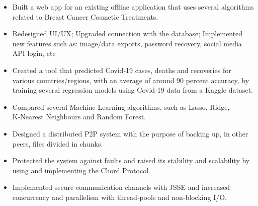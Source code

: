 \documentclass[8pt,a4paper]{altacv}
\begin{document}
\vspace{2mm}

\begin{itemize}
\item Built a web app for an existing offline application that uses several algorithms related to Breast Cancer Cosmetic Treatments.
\item Redesigned UI/UX; Upgraded connection with the database; Implemented new features such as: image/data exports, password recovery, social media API login, etc
\end{itemize}


\begin{itemize}
    \item Created a tool that predicted Covid‑19 cases, deaths and recoveries for various countries/regions, with an average of around 90 percent accuracy, by training several regression models using Covid‑19 data from a Kaggle dataset.
    \item Compared several Machine Learning algorithms, such as Lasso, Ridge, K‑Nearest Neighbours and Random Forest.
\end{itemize}

\vspace{2mm}

\begin{itemize}
    \item Designed a distributed P2P system with the purpose of backing up, in other peers, files divided in chunks.
    \item Protected the system against faults and raised its stability and scalability by using and implementing the Chord Protocol.
    \item Implemented secure communication channels with JSSE and increased concurrency and parallelism with thread‑pools and non‑blocking I/O.
\end{itemize}

\vspace{2mm}
\end{document}
